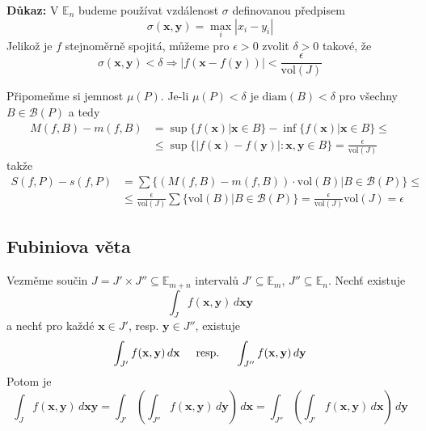 \documentclass[10pt]{article}
\begin{document}
\vspace{5mm}
\noindent
\textbf{Důkaz:}
V $\mathbb{E}_n$ budeme používat vzdálenost $\sigma$ definovanou předpisem
\[ \sigma (\mathbf{x}, \mathbf{y}) = \max_{i} |x_i - y_i| \]
Jelikož je $f$ stejnoměrně spojitá, můžeme pro $\epsilon > 0$ zvolit $\delta > 0$ takové, že
\[ \sigma (\mathbf{x}, \mathbf{y}) < \delta \Rightarrow
|f(\mathbf{x} - f(\mathbf{y}))| < \frac{\epsilon}{\textrm{vol}(J)} \]

\noindent
\hspace{1.2mm}
Připomeňme si jemnost $\mu (P)$. Je-li $\mu (P) < \delta$ je $\textrm{diam}(B) < \delta$ pro všechny
$ B \in \mathcal{B}(P) $ a tedy
\begin{align*}
    M(f, B) - m(f, B) &= \sup\{ f(\mathbf{x})|\mathbf{x} \in B \} -
    \inf\{ f(\mathbf{x})|\mathbf{x} \in B\}\leq\\
    &\leq \sup\{ |f(\mathbf{x}) - f(\mathbf{y})|: \mathbf{x}, \mathbf{y} \in B \}
    = \frac{\epsilon}{\textrm{vol}(J)}
\end{align*}
takže
\begin{align*}
    S(f,P) - s(f,P) &= \sum \{ (M(f,B) - m(f,B))\cdot \textrm{vol}(B)|B\in \mathcal{B}(P) \}\leq\\
    &\leq \frac{\epsilon}{\textrm{vol}(J)}\sum \{ \textrm{vol}(B)| B\in \mathcal{B}(P) \}
    = \frac{\epsilon}{\textrm{vol}(J)}\textrm{vol}(J) = \epsilon
\end{align*}

\subsection{Fubiniova věta}
\hspace{1.2mm}
Vezměme součin $J = J' \times J'' \subseteq \mathbb{E}_{m+n}$ intervalů $J' \subseteq \mathbb{E}_m$,
$J'' \subseteq \mathbb{E}_n$. Nechť existuje
\[ \int_{J} f(\mathbf{x}, \mathbf{y}) \,d\mathbf{xy} \]
a nechť pro každé $\mathbf{x} \in J'$, resp. $\mathbf{y} \in J''$, existuje
\[ \int_{J'} f(\mathbf{x}, \mathbf{y}) \,d\mathbf{x}
\hspace{5mm}\textrm{resp.}\hspace{5mm}
\int_{J''} f(\mathbf{x}, \mathbf{y}) \,d\mathbf{y} \]
Potom je
\[ \int_J f(\mathbf{x}, \mathbf{y}) \,d\mathbf{xy} =
\int_{J'} \left( \int_{J''} f(\mathbf{x}, \mathbf{y}) \,d\mathbf{y} \right) \,d\mathbf{x} = 
\int_{J''} \left( \int_{J'} f(\mathbf{x}, \mathbf{y}) \,d\mathbf{x} \right) \,d\mathbf{y}\]
\end{document}

